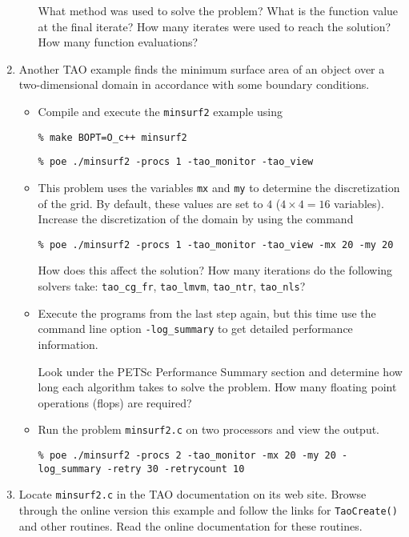 \documentclass[11pt]{article}
\begin{document}
\begin{enumerate}
\begin{itemize}
  What method was used to solve the problem?
  What is the function value at the final iterate?
  How many iterates were used to reach the solution?
  How many function evaluations?

 \newpage

\end{itemize}

\item
Another TAO example finds the minimum surface area of an object over a
two-dimensional domain in accordance with some boundary conditions.

\begin{itemize}

\item
Compile and execute the \texttt{minsurf2} example using

\texttt{\% make BOPT=O\_c++ minsurf2}

\texttt{\% poe ./minsurf2 -procs 1 -tao\_monitor -tao\_view}

\item
This problem uses the variables {\tt mx} and {\tt my} to determine
the discretization of the grid.  By default, these values are set to
$4$ ($4 \times 4 = 16$ variables). Increase the discretization of the
domain by using the command

\texttt{\% poe ./minsurf2 -procs 1 -tao\_monitor -tao\_view -mx 20 -my 20}

How does this affect the solution?
How many iterations do the following solvers take: \texttt{tao\_cg\_fr},
\texttt{tao\_lmvm}, \texttt{tao\_ntr}, \texttt{tao\_nls}?

\item
Execute the programs from the last step again, but this time use the command line option
\texttt{-log\_summary} to get detailed performance information.

Look under the PETSc Performance Summary section and determine how long
each algorithm takes to solve the problem. How many floating point operations (flops) are required?


\item
Run the problem \texttt{minsurf2.c} on two processors and view the output.

\texttt{\% poe ./minsurf2 -procs 2 -tao\_monitor -mx 20 -my 20 -log\_summary -retry 30 -retrycount 10}

\end{itemize}

\item
  Locate \texttt{minsurf2.c} in the TAO documentation on its web site.  Browse through
  the online version this example and follow the links for
  \texttt{TaoCreate()} and other routines.  Read the online documentation for these routines.


\end{enumerate}
\end{document}
